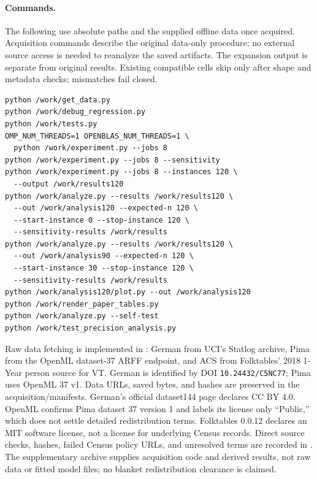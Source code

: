 \documentclass{article}
\DeclareRobustCommand{\artifact}[1]{\path{#1}}
\begin{document}
\paragraph{Commands.}
The following use absolute paths and the supplied offline data once acquired. Acquisition commands describe the original data-only procedure; no external source access is needed to reanalyze the saved artifacts. The expansion output is separate from original results. Existing compatible cells skip only after shape and metadata checks; mismatches fail closed.
\begin{verbatim}
python /work/get_data.py
python /work/debug_regression.py
python /work/tests.py
OMP_NUM_THREADS=1 OPENBLAS_NUM_THREADS=1 \
  python /work/experiment.py --jobs 8
python /work/experiment.py --jobs 8 --sensitivity
python /work/experiment.py --jobs 8 --instances 120 \
  --output /work/results120
python /work/analyze.py --results /work/results120 \
  --out /work/analysis120 --expected-n 120 \
  --start-instance 0 --stop-instance 120 \
  --sensitivity-results /work/results
python /work/analyze.py --results /work/results120 \
  --out /work/analysis90 --expected-n 120 \
  --start-instance 30 --stop-instance 120 \
  --sensitivity-results /work/results
python /work/analysis120/plot.py --out /work/analysis120
python /work/render_paper_tables.py
python /work/analyze.py --self-test
python /work/test_precision_analysis.py
\end{verbatim}
Raw data fetching is implemented in \artifact{get_data.py}: German from UCI's Statlog archive, Pima from the OpenML dataset-37 ARFF endpoint, and ACS from Folktables' 2018 1-Year person source for VT. German is identified by DOI \texttt{10.24432/C5NC77}; Pima uses OpenML 37 v1. Data URLs, saved bytes, and hashes are preserved in the acquisition/manifests. German's official dataset144 page declares CC BY 4.0. OpenML confirms Pima dataset 37 version 1 and labels its license only ``Public,'' which does not settle detailed redistribution terms. Folktables 0.0.12 declares an MIT software license, not a license for underlying Census records. Direct source checks, hashes, failed Census policy URLs, and unresolved terms are recorded in \artifact{DATA_LICENSES.md}. The supplementary archive supplies acquisition code and derived results, not raw data or fitted model files; no blanket redistribution clearance is claimed.
\end{document}
